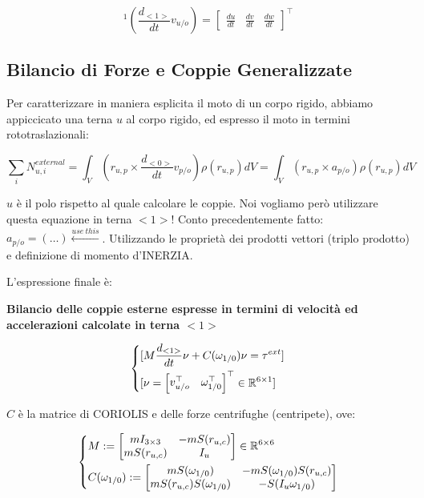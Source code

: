 \[
	^1(\frac{d_{<1>}}{dt} v_{u/o}) = \begin{bmatrix}\frac{du}{dt}&\frac{dv}{dt}&\frac{dw}{dt}\end{bmatrix}^\top
\]

\subsection{Bilancio di Forze e Coppie Generalizzate}

Per caratterizzare in maniera esplicita il moto di un corpo rigido, abbiamo appiccicato una terna $u$ al corpo rigido, ed espresso il moto in termini rototraslazionali:

\[
	\sum_i{N_{u,i}^{external}} = \int_V{(r_{u,p}\times \frac{d_{<0>}}{dt}v_{p/o})\rho(r_{u,p})dV} = \int_V{(r_{u,p}\times a_{p/o})\rho(r_{u,p})dV}
\]

$u$ è il polo rispetto al quale calcolare le coppie. Noi vogliamo però utilizzare questa equazione in terna $<1>$! Conto precedentemente fatto: $a_{p/o} = (\dots) \stackrel{use\ this}{\leftarrow}$. Utilizzando le proprietà dei prodotti vettori (triplo prodotto) e definizione di momento d'INERZIA.

L'espressione finale è:

\begin{thrm}{\textbf{Bilancio delle coppie esterne espresse in termini di velocità ed accelerazioni calcolate in terna $<1>$}}

\[	
	\left\{
	\begin{aligned}
	&[M\frac{d_{<1>}}{dt}\nu + C(\omega_{1/0})\nu = \tau^{ext}]\\
	&[\nu = \begin{bmatrix}v_{u/o}^\top&\omega_{1/0}^\top\end{bmatrix}^\top\in\mathbb{R}^{6\times 1}]
	\end{aligned}
	\right.
\]

\end{thrm}
	
$C$ è la matrice di CORIOLIS e delle forze centrifughe (centripete), ove:

\[
	\left\{
	\begin{aligned}
	&M := \begin{bmatrix}mI_{3\times 3}&-mS(r_{u,c})\\mS(r_{u,c})&I_u\end{bmatrix}\in\mathbb{R}^{6\times 6}\\
	&C(\omega_{1/0}) := \begin{bmatrix}mS(\omega_{1/0})&-mS(\omega_{1/0})S(r_{u,c})\\mS(r_{u,c})S(\omega_{1/0})&-S(I_u\omega_{1/0})\end{bmatrix}
	\end{aligned}
	\right.
\]

